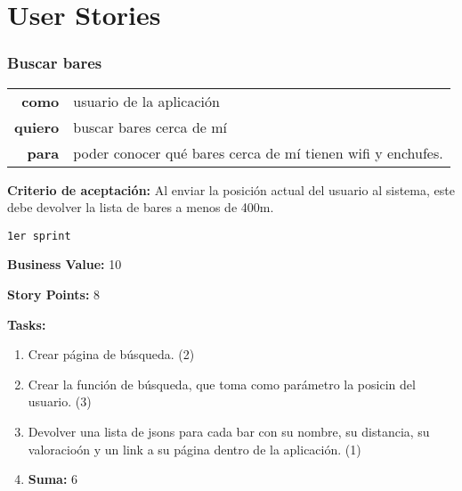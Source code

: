 \documentclass[hidelinks,a4paper,12pt, nofootinbib]{article}
\newcommand{\userstory}[3]{
\begin{tabular}{r l}
  \textbf{como} & #1 \\
  \textbf{quiero} & #2 \\
  \textbf{para} & #3 \\
\end{tabular}

}
\newcommand{\critdeacep}[1]{\textbf{Criterio de aceptación:} #1

}
\newcommand{\busvalue}[1]{\textbf{Business Value:} #1

}
\newcommand{\storypoints}[1]{\textbf{Story Points:} #1

}
\newcommand{\primersprint}{\texttt{1er sprint}

}
\newcommand{\tasks}[1]{\textbf{Tasks:} 

#1}
\begin{document}
\maketitle


\section{User Stories}

\subsubsection*{Buscar bares}

\userstory{usuario de la aplicación}{buscar bares cerca de mí}{poder conocer qué bares cerca de mí tienen wifi y enchufes.}
\critdeacep{Al enviar la posición actual del usuario al sistema, este debe devolver la lista de bares a menos de 400m.}
\primersprint
\busvalue{10}
\storypoints{8}
\tasks{
  \begin{enumerate}
    \item Crear página de búsqueda. (2)
    \item Crear la función de búsqueda, que toma como parámetro la posicin del usuario. (3)
    \item Devolver una lista de jsons para cada bar con su nombre, su distancia, su valoracioón y un link a su página dentro de la aplicación. (1)
    \item \textbf{Suma:} 6
  \end{enumerate}
}
    
\end{document}
